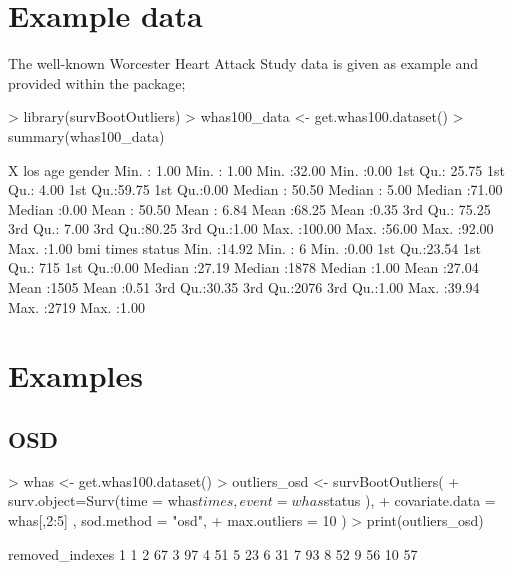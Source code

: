 \documentclass{article}
\begin{document}
\section{Example data}
The well-known Worcester Heart Attack Study data is given as example and provided within the package;

\begin{Schunk}
\begin{Sinput}
> library(survBootOutliers)
> whas100_data <-  get.whas100.dataset()
> summary(whas100_data)
\end{Sinput}
\begin{Soutput}
       X               los             age            gender    
 Min.   :  1.00   Min.   : 1.00   Min.   :32.00   Min.   :0.00  
 1st Qu.: 25.75   1st Qu.: 4.00   1st Qu.:59.75   1st Qu.:0.00  
 Median : 50.50   Median : 5.00   Median :71.00   Median :0.00  
 Mean   : 50.50   Mean   : 6.84   Mean   :68.25   Mean   :0.35  
 3rd Qu.: 75.25   3rd Qu.: 7.00   3rd Qu.:80.25   3rd Qu.:1.00  
 Max.   :100.00   Max.   :56.00   Max.   :92.00   Max.   :1.00  
      bmi            times          status    
 Min.   :14.92   Min.   :   6   Min.   :0.00  
 1st Qu.:23.54   1st Qu.: 715   1st Qu.:0.00  
 Median :27.19   Median :1878   Median :1.00  
 Mean   :27.04   Mean   :1505   Mean   :0.51  
 3rd Qu.:30.35   3rd Qu.:2076   3rd Qu.:1.00  
 Max.   :39.94   Max.   :2719   Max.   :1.00  
\end{Soutput}
\end{Schunk}

\section{Examples}

\subsection{OSD}

\begin{Schunk}
\begin{Sinput}
> whas <- get.whas100.dataset()
> outliers_osd <- survBootOutliers( 
+     surv.object=Surv(time = whas$times,event = whas$status ),
+     covariate.data = whas[,2:5] , sod.method = "osd",
+     max.outliers = 10 )
> print(outliers_osd)
\end{Sinput}
\begin{Soutput}
   removed_indexes
1                1
2               67
3               97
4               51
5               23
6               31
7               93
8               52
9               56
10              57
\end{Soutput}
\end{Schunk}
\end{document}
